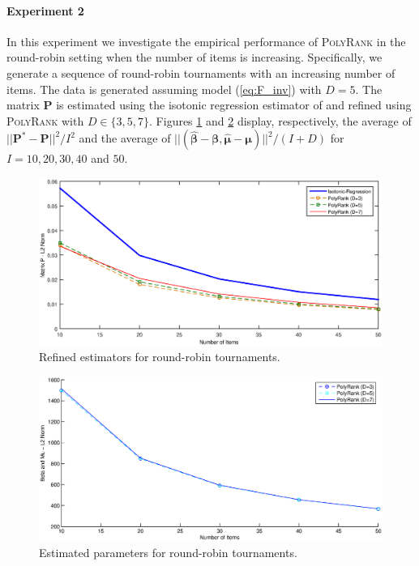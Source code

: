 \documentclass[twoside,11pt]{article}
\begin{document}
\paragraph{Experiment 2}  In this experiment we investigate the empirical performance of \textsc{PolyRank} in the round-robin setting when the number of items is increasing. Specifically, we generate a sequence of round-robin tournaments with an increasing number of items. The data is generated assuming model (\ref{eq:F_inv}) with $D=5$. The matrix $\boldsymbol{P}$ is estimated using the isotonic regression estimator of \citet{chatterjee} and refined using  \textsc{PolyRank} with $D \in \{3,5,7\}$.  Figures \ref{fig:round_robin} and \ref{fig:round_robin_parameters} display, respectively, the average of $||\boldsymbol{P}^* - \boldsymbol{P}||^2/I^2$ and the average of $||(
     \boldsymbol{\hat{\beta}} -\boldsymbol{\beta},
     \boldsymbol{\hat{\mu}} -\boldsymbol{\mu}) ||^2/(I+D)$ for $I = 10, 20, 30, 40$ and $50$.

\begin{figure}
  \centering
    \includegraphics[width=1\textwidth]{round_robin_realizable}
    \caption{Refined estimators for round-robin tournaments. \label{fig:round_robin}}
\end{figure}


\begin{figure}
  \centering
    \includegraphics[width=1\textwidth]{round_robin_parameters}
    \caption{Estimated parameters for round-robin tournaments. \label{fig:round_robin_parameters}}
\end{figure}
\end{document}
